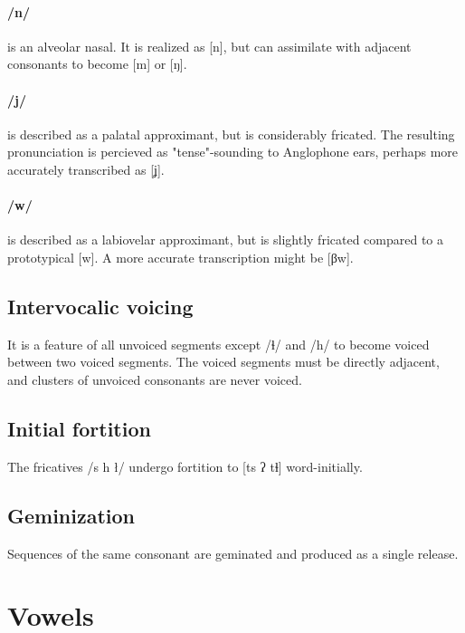 \documentclass[smallroyalvopaper,9pt]{memoir}
\newcommand{\bind}{\symbol{"0361}}
\begin{document}
\paragraph{/n/} is an alveolar nasal. It is realized as [n], but can assimilate with adjacent consonants to become [m] or [ŋ]. 

\paragraph{/j/} is described as a palatal approximant, but is considerably fricated. The resulting pronunciation is percieved as "tense"-sounding to Anglophone ears, perhaps more accurately transcribed as [ʝ].

\paragraph{/w/} is described as a labiovelar approximant, but is slightly fricated compared to a prototypical [w]. A more accurate transcription might be [β\bind{}w].

\subsection{Intervocalic voicing} \label{intervocalic}

It is a feature of all unvoiced segments except /ɬ/ and /h/ to become voiced between two voiced segments. The voiced segments must be directly adjacent, and clusters of unvoiced consonants are never voiced.


\subsection{Initial fortition} \label{initfort}

The fricatives /s h ł/ undergo fortition to [t\bind{}s ʔ t\bind{}ɬ] word-initially.


\subsection{Geminization}

Sequences of the same consonant are geminated and produced as a single release.

\newpage
\section{Vowels}
\end{document}
